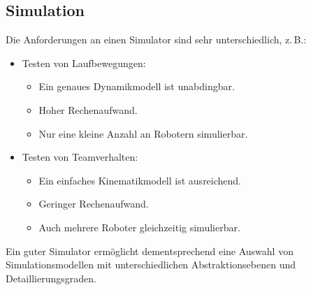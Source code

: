 		\subsection{Simulation}
			Die Anforderungen an einen Simulator sind sehr unterschiedlich, z.\,B.:
			\begin{itemize}
				\item Testen von Laufbewegungen:
					\begin{itemize}
						\item Ein genaues Dynamikmodell ist unabdingbar.
						\item Hoher Rechenaufwand.
						\item Nur eine kleine Anzahl an Robotern simulierbar.
					\end{itemize}
				\item Testen von Teamverhalten:
					\begin{itemize}
						\item Ein einfaches Kinematikmodell ist ausreichend.
						\item Geringer Rechenaufwand.
						\item Auch mehrere Roboter gleichzeitig simulierbar.
					\end{itemize}
			\end{itemize}
			Ein guter Simulator ermöglicht dementsprechend eine Auswahl von Simulationsmodellen mit unterschiedlichen Abstraktionsebenen und Detaillierungsgraden.

